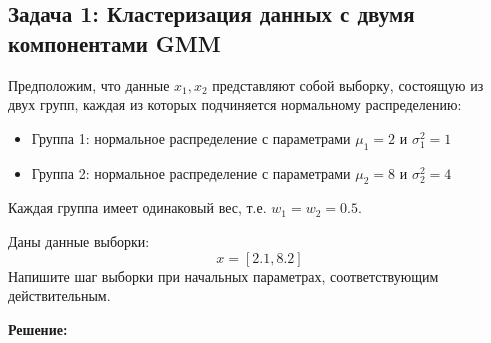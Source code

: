 \subsection{Задача 1: Кластеризация данных с двумя компонентами GMM}

Предположим, что данные $x_1, x_2$ представляют собой выборку, состоящую из двух групп, каждая из которых подчиняется нормальному распределению:
\begin{itemize}
    \item Группа 1: нормальное распределение с параметрами $\mu_1 = 2$ и $\sigma_1^2 = 1$
    \item Группа 2: нормальное распределение с параметрами $\mu_2 = 8$ и $\sigma_2^2 = 4$
\end{itemize}

Каждая группа имеет одинаковый вес, т.е. $w_1 = w_2 = 0.5$.

Даны данные выборки:
\[
    x = [2.1, 8.2]
\]
Напишите шаг выборки при начальных параметрах, соответствующим действительным.
\vspace{0.5cm}

\noindent \textbf{Решение:}

